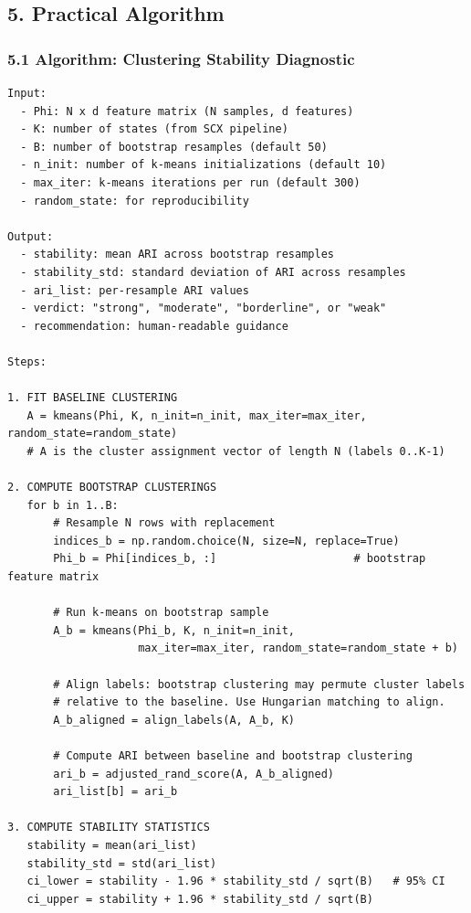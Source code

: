 \documentclass[
  12pt,
]{article}
\begin{document}
\subsection{5. Practical Algorithm}\label{practical-algorithm}

\subsubsection{5.1 Algorithm: Clustering Stability
Diagnostic}\label{algorithm-clustering-stability-diagnostic}

\begin{verbatim}
Input:
  - Phi: N x d feature matrix (N samples, d features)
  - K: number of states (from SCX pipeline)
  - B: number of bootstrap resamples (default 50)
  - n_init: number of k-means initializations (default 10)
  - max_iter: k-means iterations per run (default 300)
  - random_state: for reproducibility

Output:
  - stability: mean ARI across bootstrap resamples
  - stability_std: standard deviation of ARI across resamples
  - ari_list: per-resample ARI values
  - verdict: "strong", "moderate", "borderline", or "weak"
  - recommendation: human-readable guidance

Steps:

1. FIT BASELINE CLUSTERING
   A = kmeans(Phi, K, n_init=n_init, max_iter=max_iter, random_state=random_state)
   # A is the cluster assignment vector of length N (labels 0..K-1)

2. COMPUTE BOOTSTRAP CLUSTERINGS
   for b in 1..B:
       # Resample N rows with replacement
       indices_b = np.random.choice(N, size=N, replace=True)
       Phi_b = Phi[indices_b, :]                     # bootstrap feature matrix

       # Run k-means on bootstrap sample
       A_b = kmeans(Phi_b, K, n_init=n_init,
                    max_iter=max_iter, random_state=random_state + b)

       # Align labels: bootstrap clustering may permute cluster labels
       # relative to the baseline. Use Hungarian matching to align.
       A_b_aligned = align_labels(A, A_b, K)

       # Compute ARI between baseline and bootstrap clustering
       ari_b = adjusted_rand_score(A, A_b_aligned)
       ari_list[b] = ari_b

3. COMPUTE STABILITY STATISTICS
   stability = mean(ari_list)
   stability_std = std(ari_list)
   ci_lower = stability - 1.96 * stability_std / sqrt(B)   # 95% CI
   ci_upper = stability + 1.96 * stability_std / sqrt(B)


\end{verbatim}
\end{document}

